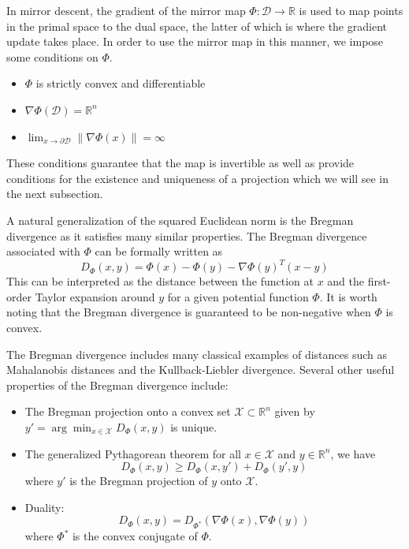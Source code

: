 In mirror descent, the gradient of the mirror map $\Phi: \mathcal{D} \rightarrow \mathbb{R}$ is used to map points in the primal space to the dual space, the latter of which is where the gradient update takes place. In order to use the mirror map in this manner, we impose some conditions on $\Phi$.
\begin{itemize}
\item $\Phi$ is strictly convex and differentiable
\item $\nabla \Phi(\mathcal{D}) = \mathbb{R}^n$
\item $\lim_{x \rightarrow \partial \mathcal{D}} \|\nabla \Phi(x)\| = \infty$
\end{itemize}
These conditions guarantee that the map is invertible as well as provide conditions for the existence and uniqueness of a projection which we will see in the next subsection.

A natural generalization of the squared Euclidean norm is the Bregman divergence as it satisfies many similar properties. The Bregman divergence associated with $\Phi$ can be formally written as
$$ D_{\Phi}(x,y) = \Phi(x) - \Phi(y) - \nabla \Phi(y)^T(x-y)$$
This can be interpreted as the distance between the function at $x$ and the first-order Taylor expansion around $y$ for a given potential function $\Phi$. It is worth noting that the Bregman divergence is guaranteed to be non-negative when $\Phi$ is convex.

The Bregman divergence includes many classical examples of distances such as Mahalanobis distances and the Kullback-Liebler divergence. Several other useful properties of the Bregman divergence include:
\begin{itemize}
    \item The Bregman projection onto a convex set $\mathcal{X} \subset \mathbb{R}^n$ given by $y' = \arg\min_{x \in \mathcal{X}} D_{\Phi}(x,y)$ is unique.
    \item The generalized Pythagorean theorem for all $x \in \mathcal{X}$ and $y \in \mathbb{R}^n$, we have
    $$D_{\Phi}(x,y) \geq D_{\Phi}(x,y') + D_{\Phi}(y',y)$$
    where $y'$ is the Bregman projection of $y$ onto $\mathcal{X}$.
    \item Duality:
    $$D_{\Phi}(x,y) = D_{\Phi^*}(\nabla \Phi(x), \nabla \Phi(y))$$
    where $\Phi^*$ is the convex conjugate of $\Phi$.
\end{itemize}



